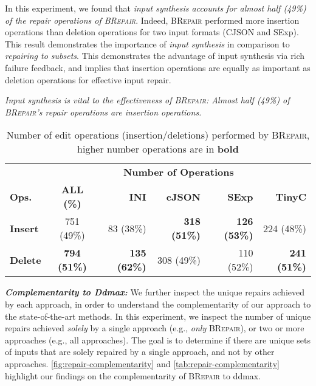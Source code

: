 \documentclass[sigconf,review,anonymous]{acmart}
\newenvironment{result}{\begin{framed}\centering\it}{\end{framed}}
\newcommand{\approach}{\textsc{BRepair}\xspace}
\begin{document}
In this experiment, we found that \textit{input synthesis accounts for almost half (49\%) of the repair operations of \approach}. Indeed, \approach performed more insertion operations than deletion operations for two input formats (CJSON and SExp). This result demonstrates the importance of \textit{input synthesis} in comparison to \textit{repairing to subsets}. This demonstrates the advantage of input synthesis via rich failure feedback, and implies that insertion operations are equally as important as deletion operations for effective input repair. 

\begin{result}
Input synthesis is vital to the effectiveness of \approach: Almost half (49\%) of \approach's repair operations are %
insertion operations. %
\end{result}


\begin{table}[!tbp]\centering
\caption{Number of edit operations (insertion/deletions) performed by \approach, higher number operations are in \textbf{bold}}
\small
\begin{tabular}{|l | c | r  r  r  r |}
\hline
&  \multicolumn{5}{c|}{\textbf{Number of  Operations}}  \\
\textbf{Ops.} & \textbf{ALL (\%)} & \textbf{INI} & \textbf{cJSON} & \textbf{SExp} & \textbf{TinyC} \\
\hline
\textbf{Insert} & 751 (49\%) & 83 (38\%) &	\textbf{318 (51\%)} &	\textbf{126 (53\%)} &	224 (48\%) \\ 
\textbf{Delete}  & \textbf{794 (51\%)} & \textbf{135 (62\%)} &	308 (49\%) &	110 (52\%) &	\textbf{241 (51\%)} \\ 
\hline
\end{tabular}
\label{tab:brepair-insertions}
\end{table}



\noindent \textbf{\textit{Complementarity to Ddmax:}} We further inspect the unique repairs achieved by each approach, in order to understand the complementarity of our approach to the state-of-the-art methods. In this experiment, we inspect the number of unique repairs achieved \textit{solely} by a single approach (e.g., \textit{only} \approach), or two or more approaches (e.g., all approaches).  The goal is to determine if there are unique sets of inputs that are solely repaired by a single approach, and not by other approaches. \autoref{fig:repair-complementarity} and \autoref{tab:repair-complementarity} highlight our findings on the complementarity of \approach to ddmax. 
\end{document}

